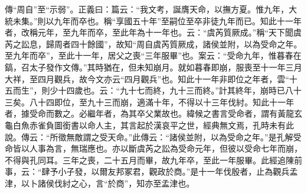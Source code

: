{\noindent\zhuan{}\fzbyks 傳“周自”至“示弱”。正義曰：篇云：“我文考，誕膺天命，以撫方夏。惟九年，大統未集。”則以九年而卒也。稱“享國五十年”至嗣位至卒非徒九年而已。知此十一年者，改稱元年，至九年而卒，至此年為十一年也。云：“虞芮質厥成。”稱“天下聞虞芮之訟息，歸周者四十餘國”，故知“周自虞芮質厥成，諸侯並附，以為受命之年。至九年而卒”，至此十一年，居父之喪“三年服畢”也。案云：“受命九年，惟暮春在鎬，召太子發作文傳。”其時猶在，但未知崩月。就如暮春即崩，服喪至十一年三月大祥，至四月觀兵，故今文亦云“四月觀兵”也。知此十一年非即位之年者，雲“十五而生”，則少十四歲也。云：“九十七而終，九十三而終。”計其終年，崩時已八十三矣。八十四即位，至九十三而崩，適滿十年，不得以十三年伐紂。知此十一年者，據受命而數之。必繼年者，為其卒父業故也。緯候之書言受命者，謂有黃龍玄龜白魚赤雀負圖銜書以命人主，其言起於漢哀平之世，經典無文焉，孔時未有此說。傳云：“所徵無敵謂之受天命。”此傳云：“諸侯並附，以為受命之年。”是孔解受命皆以人事為言，無瑞應也。亦以斷虞芮之訟為受命元年，但彼以受命七年而崩，不得與孔同耳。三年之喪，二十五月而畢，故九年卒，至此一年服畢。此經追陳前事，云：“肆予小子發，以爾友邦冢君，觀政於商。”是十一年伐殷者，止為觀兵孟津，以卜諸侯伐紂之心，言“於商”，知亦至孟津也。 \par}

